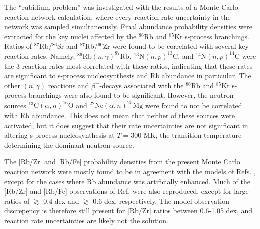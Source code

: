 The ``rubidium problem'' was investigated with the results of a Monte Carlo reaction network calculation, where every reaction rate uncertainty in the network was sampled simultaneously. Final abundance probability densities were extracted for the key nuclei affected by the $^{86}$Rb and $^{85}$Kr s-process branchings. Ratios of $^{87}$Rb/$^{86}$Sr and $^{87}$Rb/$^{90}$Zr were found to be correlated with several key reaction rates. Namely, $^{86}\mathrm{Rb}(n,\gamma)^{87}\mathrm{Rb}$, $^{13}\mathrm{N}(n,p)^{13}\mathrm{C}$, and $^{14}\mathrm{N}(n,p)^{14}\mathrm{C}$ were the 3 reaction rates most correlated with these ratios, indicating that these rates are significant to s-process nucleosynthesis and Rb abundance in particular. The other $(n,\gamma)$ reactions and $\beta^{-}$-decays associated with the $^{86}$Rb and $^{85}$Kr s-process branchings were also found to be significant. However, the neutron sources $^{13}\mathrm{C}(\alpha,n)^{16}\mathrm{O}$ and $^{22}\mathrm{Ne}(\alpha,n)^{25}\mathrm{Mg}$ were found to not be correlated with Rb abundance. This does not mean that neither of these sources were activated, but it does suggest that their rate uncertainties are not significant in altering s-process nucleosynthesis at $T = 300$ MK, the transition temperature determining the dominant neutron source.

The [Rb/Zr] and [Rb/Fe] probability densities from the present Monte Carlo reaction network were mostly found to be in agreement with the models of Refs. \cite{Karakas2012,Raai2012,Karakas2016,Pignatari2016}, except for the cases where Rb abundance was artificially enhanced. Much of the [Rb/Zr] and [Rb/Fe] observations of Ref. \cite{Perez2017} were also reproduced, except for large ratios of $\gtrsim$ 0.4 dex and $\gtrsim$ 0.6 dex, respectively. The model-observation discrepency is therefore still present for [Rb/Zr] ratios between 0.6-1.05 dex, and reaction rate uncertainties are likely not the solution.